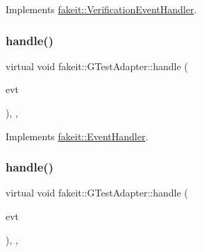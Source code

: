 Implements \mbox{\hyperlink{structfakeit_1_1VerificationEventHandler_a826b9d15e23bad7013b219d8e45ef1d0}{fakeit\+::\+Verification\+Event\+Handler}}.

\mbox{\label{structfakeit_1_1GTestAdapter_a68bb18a833f63973f09d12597deb1cf7}} 
\subsubsection{\texorpdfstring{handle()}{handle()}\hspace{0.1cm}{\footnotesize\ttfamily [4/6]}}
{\footnotesize\ttfamily virtual void fakeit\+::\+G\+Test\+Adapter\+::handle (\begin{DoxyParamCaption}\item[{const \mbox{\hyperlink{structfakeit_1_1UnexpectedMethodCallEvent}{Unexpected\+Method\+Call\+Event}} \&}]{evt }\end{DoxyParamCaption})\hspace{0.3cm}{\ttfamily [inline]}, {\ttfamily [override]}, {\ttfamily [virtual]}}



Implements \mbox{\hyperlink{structfakeit_1_1EventHandler_a4de5ad05e5de73e36f4b2cede6d8efd3}{fakeit\+::\+Event\+Handler}}.

\mbox{\label{structfakeit_1_1GTestAdapter_ae97137644f1ec31fbd146a901ea81557}} 
\subsubsection{\texorpdfstring{handle()}{handle()}\hspace{0.1cm}{\footnotesize\ttfamily [5/6]}}
{\footnotesize\ttfamily virtual void fakeit\+::\+G\+Test\+Adapter\+::handle (\begin{DoxyParamCaption}\item[{const \mbox{\hyperlink{structfakeit_1_1SequenceVerificationEvent}{Sequence\+Verification\+Event}} \&}]{evt }\end{DoxyParamCaption})\hspace{0.3cm}{\ttfamily [inline]}, {\ttfamily [override]}, {\ttfamily [virtual]}}



